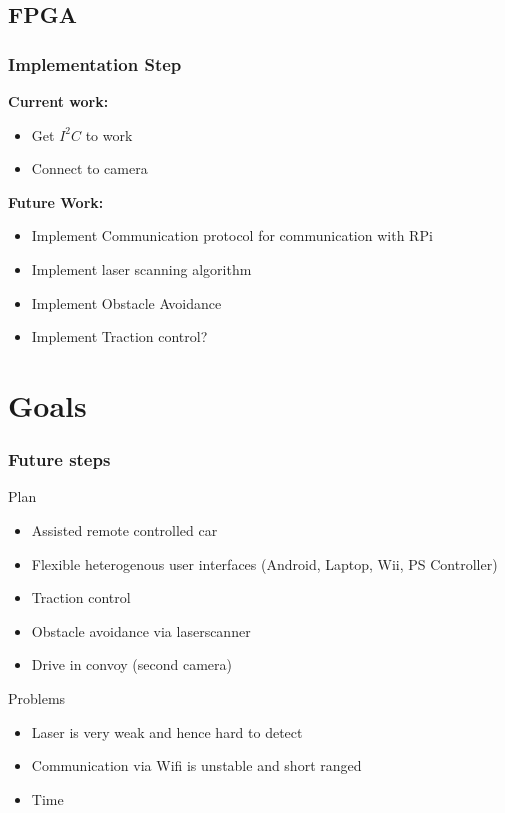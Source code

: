 \documentclass[pdf]{beamer}
\begin{document}
\subsection{FPGA}
\begin{frame}
  \frametitle{Implementation Step}
  \textbf{Current work:}
  \begin{itemize}
  \item Get $I^2C$ to work
  \item Connect to camera
  \end{itemize}
\vspace{2em}
  \textbf{Future Work:}
  \begin{itemize}
  \item Implement Communication protocol for communication with RPi
  \item Implement laser scanning algorithm
  \item Implement Obstacle Avoidance
  \item Implement Traction control?
  \end{itemize}

\end{frame}

\section{Goals}
\begin{frame}
\frametitle{Future steps}
\begin{exampleblock}{Plan}
\begin{itemize}
\item Assisted remote controlled car
\item Flexible heterogenous user interfaces (Android, Laptop, Wii, PS Controller)
\item Traction control
\item Obstacle avoidance via laserscanner
\item Drive in convoy (second camera)
\end{itemize}
\end{exampleblock}
\begin{alertblock}{Problems}
\begin{itemize}
\item Laser is very weak and hence hard to detect
\item Communication via Wifi is unstable and short ranged
\item Time
\end{itemize}

\end{alertblock}
\end{frame}
\end{document}
